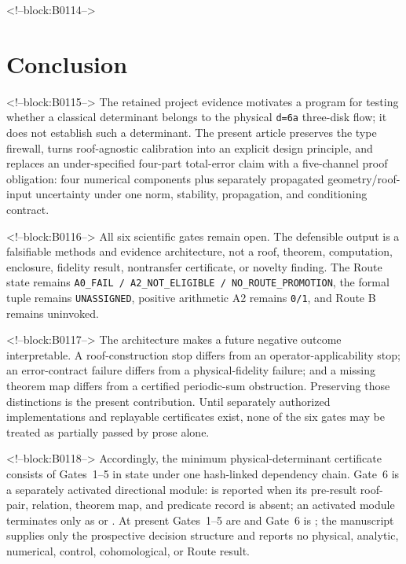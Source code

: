 \documentclass[11pt,a4paper]{article}
\begin{document}
<!--block:B0114-->
\section{Conclusion}

<!--block:B0115-->
The retained project evidence motivates a program for testing whether a classical determinant belongs to the physical \texttt{d=6a} three-disk flow; it does not establish such a determinant. The present article preserves the type firewall, turns roof-agnostic calibration into an explicit design principle, and replaces an under-specified four-part total-error claim with a five-channel proof obligation: four numerical components plus separately propagated geometry/roof-input uncertainty under one norm, stability, propagation, and conditioning contract.

<!--block:B0116-->
All six scientific gates remain open. The defensible output is a falsifiable methods and evidence architecture, not a roof, theorem, computation, enclosure, fidelity result, nontransfer certificate, or novelty finding. The Route state remains \texttt{A0\_FAIL\ /\ A2\_NOT\_ELIGIBLE\ /\ NO\_ROUTE\_PROMOTION}, the formal tuple remains \texttt{UNASSIGNED}, positive arithmetic A2 remains \texttt{0/1}, and Route B remains uninvoked.

<!--block:B0117-->
The architecture makes a future negative outcome interpretable. A roof-construction stop differs from an operator-applicability stop; an error-contract failure differs from a physical-fidelity failure; and a missing theorem map differs from a certified periodic-sum obstruction. Preserving those distinctions is the present contribution. Until separately authorized implementations and replayable certificates exist, none of the six gates may be treated as partially passed by prose alone.

<!--block:B0118-->
Accordingly, the minimum physical-determinant certificate consists of Gates~1--5 in  state under one hash-linked dependency chain. Gate~6 is a separately activated directional module:  is reported when its pre-result roof-pair, relation, theorem map, and predicate record is absent; an activated module terminates only as  or . At present Gates~1--5 are  and Gate~6 is ; the manuscript supplies only the prospective decision structure and reports no physical, analytic, numerical, control, cohomological, or Route result.
\end{document}
